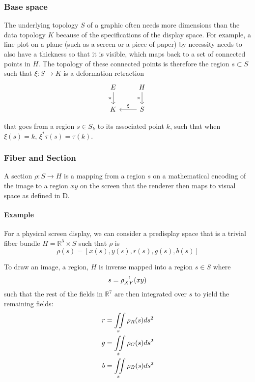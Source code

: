 \documentclass[../main.tex]{subfiles}
\begin{document}
\subsubsection{Base space}
The underlying topology $S$ of a graphic often needs more dimensions than the data topology $K$ because of the specifications of the display space. For example, a line plot on a plane (such as a screen or a piece of paper) by necessity needs to also have a thickness so that it is visible, which maps back to a set of connected points in $H$. The topology of these connected points is therefore the region $s \subset S$ such that $\xi: S \rightarrow K$ is a deformation retraction \cite{RetractionTopology2020}
\begin{equation}
    \begin{tikzcd}
        E \arrow[d, "\pi"'] & H \arrow[d, "\pi"'] \\
        K                   & S \arrow[l, "\xi"']
        \end{tikzcd}
\end{equation}

that goes from a region $s \in S_{k}$ to its associated point $k$, such that when $\xi(s) = k$, $\xi^*\tau(s) = \tau(k)$. 

\subsubsection{Fiber and Section}
A section $\rho: S \rightarrow H$ is a mapping from a region $s$ on a mathematical encoding of the image to a region $xy$ on the screen that the renderer then maps to visual space as defined in D.

\paragraph{Example}
For a physical screen display, we can consider a predisplay space that is a trivial fiber bundle $H=\mathbb{R}^{5}\times S$ such that $\rho$ is
\begin{equation}
    \rho(s)  = [x(s), y(s), r(s), g(s), b(s)]
    \label{eq:rho}
\end{equation}

To draw an image, a region, $H$ is inverse mapped into a region $s \in S$ where
\begin{equation}
s = \rho^{-1}_{\tiny{XY}}(xy)
\end{equation}
such that the rest of the fields in $\mathbb{R}^{7}$ are then integrated over $s$ to yield the remaining fields:
\begin{align}
    r &= \iint\limits_s \rho_{\tiny{R}}(s)ds^{2}\\
    g &= \iint\limits_s \rho_{\tiny{G}}(s)ds^{2}\\
    b &= \iint\limits_s \rho_{\tiny{B}}(s)ds^{2}
\end{align}
\end{document}
